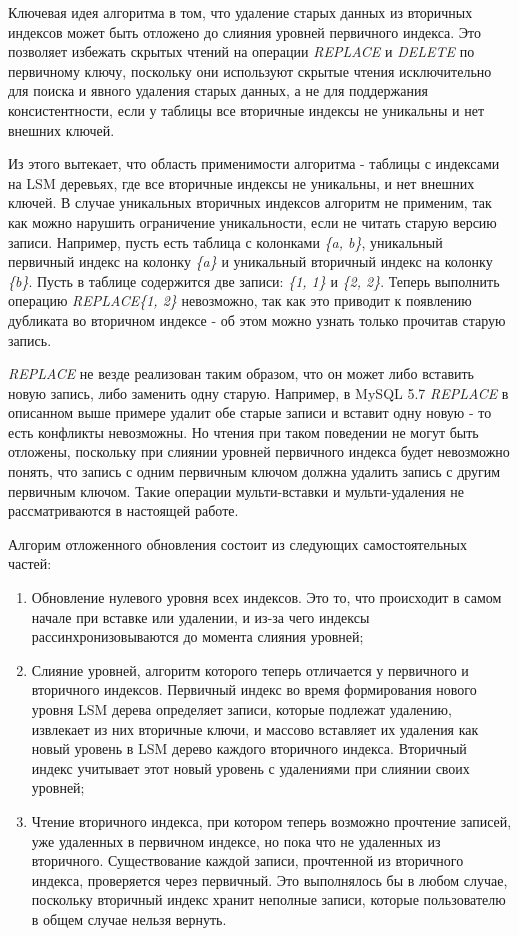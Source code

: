 \documentclass[a4paper,hidelinks,12pt]{article}
\begin{document}
Ключевая идея алгоритма в том, что удаление старых данных из вторичных индексов
может быть отложено до слияния уровней первичного индекса. Это позволяет
избежать скрытых чтений на операции \textit{REPLACE} и \textit{DELETE} по
первичному ключу, поскольку они используют скрытые чтения исключительно для
поиска и явного удаления старых данных, а не для поддержания консистентности,
если у таблицы все вторичные индексы не уникальны и нет внешних ключей.

Из этого вытекает, что область применимости алгоритма - таблицы с индексами на
LSM деревьях, где все вторичные индексы не уникальны, и нет внешних ключей. В
случае уникальных вторичных индексов алгоритм не применим, так как можно
нарушить ограничение уникальности, если не читать старую версию записи.
Например, пусть есть таблица с колонками \textit{\{a, b\}}, уникальный первичный
индекс на колонку \textit{\{a\}} и уникальный вторичный индекс на колонку
\textit{\{b\}}. Пусть в таблице содержится две записи: \textit{\{1, 1\}} и
\textit{\{2, 2\}}. Теперь выполнить операцию \textit{REPLACE\{1, 2\}} невозможно,
так как это приводит к появлению дубликата во вторичном индексе - об этом можно
узнать только прочитав старую запись.

\textit{REPLACE} не везде реализован таким образом, что он может либо вставить
новую запись, либо заменить одну старую. Например, в MySQL 5.7 \textit{REPLACE}
в описанном выше примере удалит обе старые записи и вставит одну новую - то есть
конфликты невозможны. Но чтения при таком поведении не могут быть отложены,
поскольку при слиянии уровней первичного индекса будет невозможно понять, что
запись с одним первичным ключом должна удалить запись с другим первичным ключом.
Такие операции мульти-вставки и мульти-удаления не рассматриваются в настоящей
работе.

Алгорим отложенного обновления состоит из следующих самостоятельных частей:
\begin{enumerate}
\item Обновление нулевого уровня всех индексов. Это то, что происходит в самом
начале при вставке или удалении, и из-за чего индексы рассинхронизовываются до
момента слияния уровней;
\item Слияние уровней, алгоритм которого теперь отличается у первичного и
вторичного индексов. Первичный индекс во время формирования нового уровня LSM
дерева определяет записи, которые подлежат удалению, извлекает из них вторичные
ключи, и массово вставляет их удаления как новый уровень в LSM дерево каждого
вторичного индекса. Вторичный индекс учитывает этот новый уровень с удалениями
при слиянии своих уровней;
\item Чтение вторичного индекса, при котором теперь возможно прочтение записей,
уже удаленных в первичном индексе, но пока что не удаленных из вторичного.
Существование каждой записи, прочтенной из вторичного индекса, проверяется через
первичный. Это выполнялось бы в любом случае, поскольку вторичный индекс хранит
неполные записи, которые пользователю в общем случае нельзя вернуть.
\end{enumerate}
\end{document}
